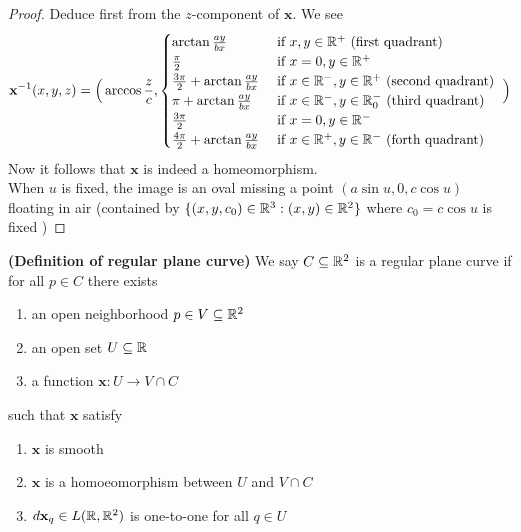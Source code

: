 \documentclass{report}
\begin{document}
\begin{proof}
Deduce first from the $z$-component of  $\textbf{x}$. We see
\begin{align*}
\textbf{x}^{-1}(x,y,z)=
  \Big(\arccos \frac{z}{c}, \begin{cases}
    \arctan \frac{ay}{bx}& \text{ if $x,y\in\mathbb{R}^+$ (first quadrant) }\\
    \frac{\pi}{2}& \text{ if $x=0,y\in\mathbb{R}^+$ }\\
    \frac{3\pi}{2}+\arctan \frac{ay}{bx}& \text{ if $x\in\mathbb{R}^-,y\in\mathbb{R}^+$ (second quadrant) }\\
    \pi + \arctan \frac{ay}{bx}& \text{ if $x\in\mathbb{R}^-,y\in\mathbb{R}^-_0$ (third quadrant) }\\ 
    \frac{3\pi }{2}& \text{ if $x=0,y\in\mathbb{R}^-$ }\\
    \frac{4\pi }{2}+\arctan \frac{ay}{bx}& \text{ if $x\in\mathbb{R}^+,y\in\mathbb{R}^-$ (forth quadrant) }
  \end{cases}\Big)
\end{align*}
Now it follows that $\textbf{x}$ is indeed a homeomorphism.\\

When $u$ is fixed, the image is an oval missing a point $(a\sin u, 0,c \cos u)$ floating in air (contained by $\{ (x,y,c_0)\in\mathbb{R}^3:(x,y)\in\mathbb{R}^2 \}$ where $c_0=c \cos u$ is fixed )
\end{proof}
\begin{definition}
\textbf{(Definition of regular plane curve)} We say $C\subseteq \mathbb{R}^2$ is a regular plane curve if for all $p\in  C$ there exists 
\begin{enumerate}[label=(\alph*)]
  \item an open neighborhood $p \in V \subseteq \mathbb{R}^2$ 
  \item an open set $U\subseteq \mathbb{R}$
  \item a function $\textbf{x}:U \rightarrow V\cap C $
\end{enumerate}
such that $\textbf{x}$ satisfy
\begin{enumerate}[label=(\alph*)]
  \item $\textbf{x}$ is smooth 
  \item $\textbf{x}$ is a homoeomorphism between $U$ and  $V\cap C$
  \item $d\textbf{x}_q\in L(\mathbb{R},\mathbb{R}^2)$ is one-to-one for all $q \in U$
\end{enumerate}
\end{definition}
\end{document}
